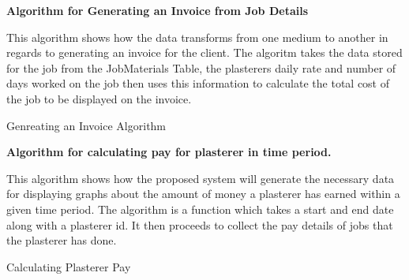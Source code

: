 \textbf{Algorithm for Generating an Invoice from Job Details}
\begin{flushleft}
This algorithm shows how the data transforms from one medium to another in regards to generating an invoice for the client. The algoritm takes the data stored for the job from the JobMaterials Table, the plasterers daily rate and number of days worked on the job then uses this information to calculate the total cost of the job to be displayed on the invoice.
\end{flushleft}
\begin{algorithm}[H]
\label{fig:generating_an_invoice_example}
\caption{Genreating an Invoice Algorithm}
\begin{algorithmic}[1]
	\State
	\State
		\State
		\State
	\EndFor
	\State
	\State
\EndFunction
\end{algorithmic}
\end{algorithm}

\pagebreak
\textbf{Algorithm for calculating pay for plasterer in time period.}
\begin{flushleft}
This algorithm shows how the proposed system will generate the necessary data for displaying graphs about the amount of money a plasterer has earned within a given time period. The algorithm is a function which takes a start and end date along with a plasterer id. It then proceeds to collect the pay details of jobs that the plasterer has done.
\end{flushleft}
\begin{algorithm}[H]
\label{fig:calculating_plasterer_pay}
\caption{Calculating Plasterer Pay}
\begin{algorithmic}[1]

	\State
	\State
			\State
			\State
		\EndIf
	\EndFor
	\State
\EndFunction
\end{algorithmic}
\end{algorithm}

